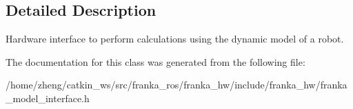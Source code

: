 \subsection{Detailed Description}
Hardware interface to perform calculations using the dynamic model of a robot. 

The documentation for this class was generated from the following file\+:\begin{DoxyCompactItemize}
\item 
/home/zheng/catkin\+\_\+ws/src/franka\+\_\+ros/franka\+\_\+hw/include/franka\+\_\+hw/franka\+\_\+model\+\_\+interface.\+h\end{DoxyCompactItemize}
